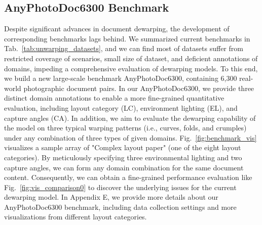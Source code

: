 \subsection{AnyPhotoDoc6300 Benchmark}
\label{sec:data}
Despite significant advances in document dewarping, the development of corresponding benchmarks lags behind. We summarized current benchmarks in Tab.~\ref{tab:unwarping_datasets}, and we can find most of datasets suffer from restricted coverage of scenarios, small size of dataset, and deficient annotations of domains, impeding a comprehensive evaluation of dewarping models. To this end, we build a new large-scale benchmark AnyPhotoDoc6300, containing 6,300 real-world photographic document pairs. In our AnyPhotoDoc6300, we provide three distinct domain annotations to enable a more fine-grained quantitative evaluation, including layout category (LC), environment lighting (EL), and capture angles (CA). 
In addition, we aim to evaluate the dewarping capability of the model on three typical warping patterns (i.e., curves, folds, and crumples) under any combination of three types of given domains.
Fig.~\ref{fig:benchmark_vis} visualizes a sample array of "Complex layout paper" (one of the eight layout categories). 
By meticulously specifying three environmental lighting and two capture angles, we can form any domain combination for the same document content. Consequently, we can obtain a fine-grained performance evaluation like Fig.~\ref{fig:vis_comparison0} to discover the underlying issues for the current dewarping model. In Appendix E, we provide more details about our AnyPhotoDoc6300 benchmark, including data collection settings and more visualizations from different layout categories. 








